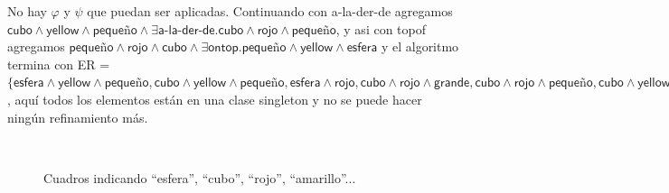 No hay
$\varphi$ y $\psi$ que puedan ser aplicadas. Continuando con \textsf{a-la-der-de} agregamos $\textsf{cubo} \wedge \textsf{yellow} \wedge \textsf{peque\~no} \wedge \exists \textsf{a-la-der-de}. \textsf{cubo} \wedge \textsf{rojo} \wedge \textsf{peque\~no}$, y asi con \textsf{topof} agregamos $\textsf{peque\~no} \wedge \textsf{rojo} \wedge \textsf{cubo} \wedge \exists \textsf{ontop}. \textsf{peque\~no} \wedge \textsf{yellow} \wedge \textsf{esfera}$ y el algoritmo termina con ER = $\{\textsf{esfera} \wedge \textsf{yellow} \wedge \textsf{peque\~no}, \textsf{cubo} \wedge \textsf{yellow} \wedge \textsf{peque\~no}, \textsf{esfera} \wedge \textsf{rojo}, \textsf{cubo} \wedge \textsf{rojo} \wedge \textsf{grande}, \textsf{cubo} \wedge \textsf{rojo} \wedge \textsf{peque\~no}, \textsf{cubo} \wedge \textsf{yellow} \wedge \textsf{peque\~no} \wedge \exists \textsf{a-la-der-de}. \textsf{cubo} \wedge \textsf{rojo} \wedge \textsf{peque\~no}, \textsf{peque\~no} \wedge \textsf{rojo} \wedge \textsf{cubo} \wedge \exists \textsf{ontop}. \textsf{peque\~no} \wedge \textsf{yellow} \wedge \textsf{esfera}\}$, 
aqu\'i todos los elementos est\'an en una clase singleton y no se puede hacer ning\'un refinamiento m\'as. 


\begin{figure}[ht]
\begin{center}
\\[0pt]
\caption{Cuadros indicando ``esfera'', ``cubo'', ``rojo'', ``amarillo''...}
\label{fig-modelo16}
\end{center}
\end{figure}

